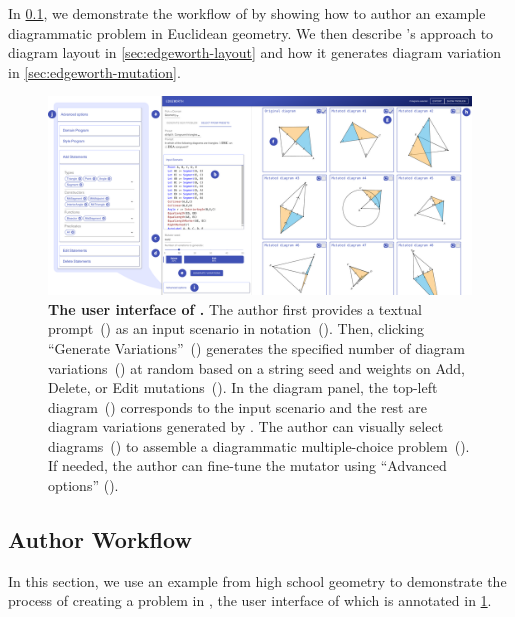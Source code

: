 In \cref{sec:edgeworth-workflow}, we demonstrate the workflow of \Edgeworth by showing how to author an example diagrammatic problem in Euclidean geometry. We then describe \Edgeworth's approach to diagram layout in \cref{sec:edgeworth-layout} and how it generates diagram variation in \cref{sec:edgeworth-mutation}. 


\begin{figure}
    \centering
    \includegraphics[width=\linewidth]{assets/edgeworth/edgeworth-ui-new.pdf}
    \caption{\textbf{The user interface of \Edgeworth.} \textmd{The author first provides a textual prompt~() as an input scenario in \Substance notation~(). Then, clicking ``Generate Variations''~() generates the specified number of diagram variations~() at random based on a string seed and weights on Add, Delete, or Edit mutations~(). In the diagram panel, the top-left diagram~() corresponds to the input scenario and the rest are diagram variations generated by \Edgeworth. The author can visually select diagrams~() to assemble a diagrammatic multiple-choice problem~(). If needed, the author can fine-tune the mutator using ``Advanced options'' (}).}
    \label{fig:edgeworth-interface}
\end{figure}

\subsection{Author Workflow}
\label{sec:edgeworth-workflow}

In this section, we use an example from high school geometry to demonstrate the process of creating a problem in \Edgeworth, the user interface of which is annotated in \cref{fig:edgeworth-interface}. 

